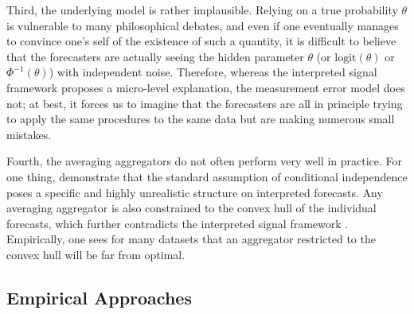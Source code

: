 \documentclass[12pt]{article}
\theoremstyle{definition}
\theoremstyle{definition}
\def\logit{\text{logit}}
\begin{document}

Third,  the
underlying model is rather implausible. Relying on a true probability $\theta$ is vulnerable to
many philosophical debates, and even if one eventually manages to
convince one's self of the existence of such a quantity, it is
difficult to believe that the forecasters are actually seeing the
hidden parameter $\theta$ (or $\logit(\theta)$ or
$\Phi^{-1}(\theta)$) with independent noise. Therefore, whereas the
interpreted signal framework proposes a micro-level explanation, the
measurement error model does not; at best, it forces us to imagine that
the forecasters are all in principle trying to apply the same
procedures to the same data but are making numerous small mistakes. 

Fourth, the averaging aggregators do not often perform
very well in practice. For one thing,  \citet{hong2009interpreted} demonstrate that the standard
assumption of conditional independence poses a specific and highly
unrealistic structure on interpreted forecasts. Any averaging aggregator is also constrained to
the convex hull of the individual forecasts, which further contradicts the
interpreted signal framework \citep{parunak2013characterizing}.  Empirically, one sees
for many datasets that an aggregator restricted to the convex hull
will be far from optimal.

\subsection{Empirical Approaches}
\label{ss:empirical}
\end{document}
